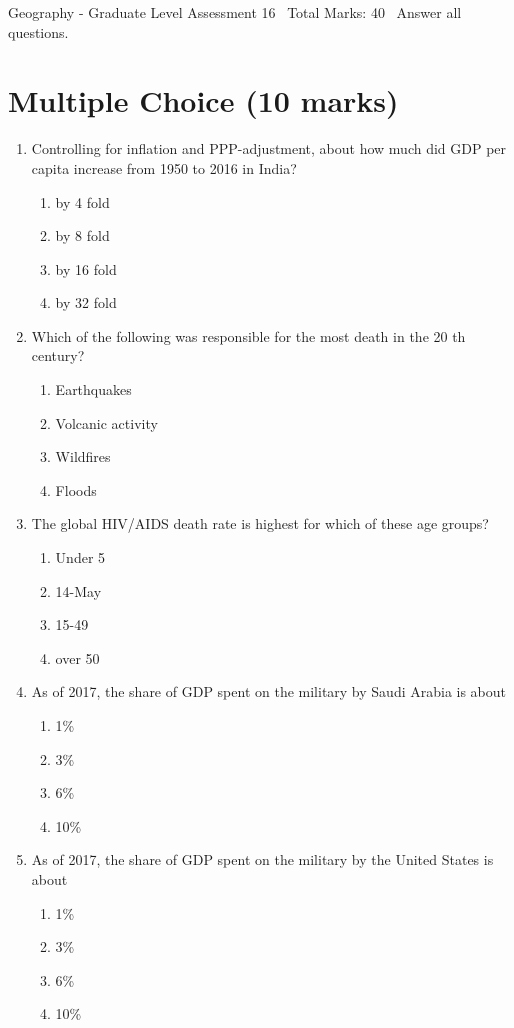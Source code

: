 \documentclass[12pt]{article}
\begin{document}
\begin{center}
Geography - Graduate Level Assessment 16 \
Total Marks: 40 \
Answer all questions.
\end{center}

\section*{Multiple Choice (10 marks)}
\begin{enumerate}[label=\arabic*.]
\item Controlling for inflation and PPP-adjustment, about how much did GDP per capita increase from 1950 to 2016 in India?
\begin{enumerate}[label=(\alph*)]
    \item by 4 fold
    \item by 8 fold
    \item by 16 fold
    \item by 32 fold
\end{enumerate}
\item Which of the following was responsible for the most death in the 20 th century?
\begin{enumerate}[label=(\alph*)]
    \item Earthquakes
    \item Volcanic activity
    \item Wildfires
    \item Floods
\end{enumerate}
\item The global HIV/AIDS death rate is highest for which of these age groups?
\begin{enumerate}[label=(\alph*)]
    \item Under 5
    \item 14-May
    \item 15-49
    \item over 50
\end{enumerate}
\item As of 2017, the share of GDP spent on the military by Saudi Arabia is about
\begin{enumerate}[label=(\alph*)]
    \item 1\%
    \item 3\%
    \item 6\%
    \item 10\%
\end{enumerate}
\item As of 2017, the share of GDP spent on the military by the United States is about
\begin{enumerate}[label=(\alph*)]
    \item 1\%
    \item 3\%
    \item 6\%
    \item 10\%
\end{enumerate}
\end{enumerate}
\end{document}
